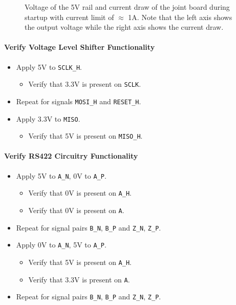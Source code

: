 \begin{figure}[h]
	\centering
	\caption[Voltages and current of 5V converter without current limit.]{Voltage of the 5V rail and current draw of the joint board during startup with current limit of $\approx$ 1A. Note that the left axis shows the output voltage while the right axis shows the current draw.}
	\label{fig:joint_no_curr_limit}
\end{figure}

\paragraph{Verify Voltage Level Shifter Functionality} %
\label{par:verify_voltage_level_shifter_functionality}
\begin{itemize}
	\item Apply 5V to \texttt{SCLK\_H}.
	\begin{itemize}
		\item[\cmark]  Verify that 3.3V is present on \texttt{SCLK}.
	\end{itemize}
	\item Repeat for signals \texttt{MOSI\_H} and \texttt{RESET\_H}.
	\item Apply 3.3V to \texttt{MISO}.
	\begin{itemize}
		\item[\cmark]  Verify that 5V is present on \texttt{MISO\_H}.
	\end{itemize}
\end{itemize}

\paragraph{Verify RS422 Circuitry Functionality} %
\label{par:verify_rs_422_circuitry_functionality}
\begin{itemize}
	\item Apply 5V to \texttt{A\_N}, 0V to \texttt{A\_P}.
	\begin{itemize}
		\item[\cmark] Verify that 0V is present on \texttt{A\_H}.
		\item[\cmark] Verify that 0V is present on \texttt{A}.
	\end{itemize}
	\item Repeat for signal pairs \texttt{B\_N}, \texttt{B\_P} and \texttt{Z\_N}, \texttt{Z\_P}.
	\item Apply 0V to \texttt{A\_N}, 5V to \texttt{A\_P}.
	\begin{itemize}
		\item[\cmark] Verify that 5V is present on \texttt{A\_H}.
		\item[\cmark] Verify that 3.3V is present on \texttt{A}.
	\end{itemize}
	\item Repeat for signal pairs \texttt{B\_N}, \texttt{B\_P} and \texttt{Z\_N}, \texttt{Z\_P}.
\end{itemize}
